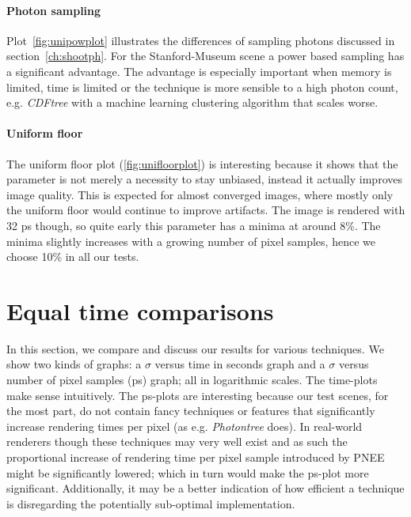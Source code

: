 \paragraph{Photon sampling}
\label{ch:ev:photonsampling}

Plot~\ref{fig:unipowplot} illustrates the differences of sampling photons discussed in section~\ref{ch:shootph}. For the Stanford-Museum scene a power based sampling has a significant advantage. The advantage is especially important when memory is limited, time is limited or the technique is more sensible to a high photon count, e.g. \textit{CDFtree} with a machine learning clustering algorithm that scales worse.  

\paragraph{Uniform floor}
\label{ch:ev:uniformfloor}
The uniform floor plot (\ref{fig:unifloorplot}) is interesting because it shows that the parameter is not merely a necessity to stay unbiased, instead it actually improves image quality. This is expected for almost converged images, where mostly only the uniform floor would continue to improve artifacts. The image is rendered with 32 ps though, so quite early this parameter has a minima at around 8\%. The minima slightly increases with a growing number of pixel samples, hence we choose 10\% in all our tests.




\section{Equal time comparisons}
\label{sec:etc}
In this section, we compare and discuss our results for various techniques. We show two kinds of graphs: a $\sigma$ versus time in seconds graph and a $\sigma$ versus number of pixel samples (ps) graph; all in logarithmic scales. The time-plots make sense intuitively. The ps-plots are interesting because our test scenes, for the most part, do not contain fancy techniques or features that significantly increase rendering times per pixel (as e.g. \textit{Photontree} does). In real-world renderers though these techniques may very well exist and as such the proportional increase of rendering time per pixel sample introduced by PNEE might be significantly lowered; which in turn would make the ps-plot more significant. Additionally, it may be a better indication of how efficient a technique is disregarding the potentially sub-optimal implementation.

